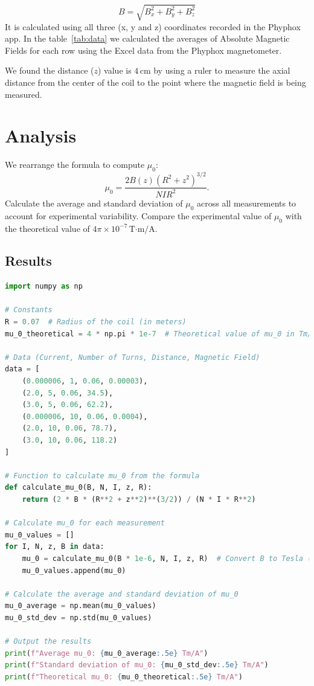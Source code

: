 \documentclass[notitlepage]{report}
\newcounter{theo}[section]\setcounter{theo}{0}
\numberwithin{equation}{section}
\theoremstyle{plain}
\theoremstyle{definition}
\theoremstyle{remark}
\begin{document}
\[
B = \sqrt{B_x^2 + B_y^2 + B_z^2}
\]
It is calculated using all three (x, y and z) coordinates recorded in the
Phyphox app. In the table~\ref{tab:data} we calculated the averages of
Absolute Magnetic Fields for each row using the Excel data from the Phyphox
magnetometer.

We found the distance (\(z\)) value is \(4 \, \text{cm}\) by using a ruler to
measure the axial distance from the center of the coil to the point where the
magnetic field is being measured.  

\section{Analysis}
We rearrange the formula to compute \(\mu_0\):
\[
    \mu_0 = \frac{2 B(z) {\left(R^2 + z^2\right)}^{3/2}}{N I R^2}.
\]
Calculate the average and standard deviation of \(\mu_0\) across all
measurements to account for experimental variability. Compare the experimental
value of \(\mu_0\) with the theoretical value of \(4\pi \times 10^{-7} \,
\text{T·m/A}\).


\subsection{Results}

\begin{lstlisting}[language=Python, caption={Python code for calculating \(\mu_0\)}, basicstyle=\ttfamily\footnotesize, keywordstyle=\color{blue}, commentstyle=\color{gray}]
import numpy as np

# Constants
R = 0.07  # Radius of the coil (in meters)
mu_0_theoretical = 4 * np.pi * 1e-7  # Theoretical value of mu_0 in Tm/A

# Data (Current, Number of Turns, Distance, Magnetic Field)
data = [
    (0.000006, 1, 0.06, 0.00003),
    (2.0, 5, 0.06, 34.5),
    (3.0, 5, 0.06, 62.2),
    (0.000006, 10, 0.06, 0.0004),
    (2.0, 10, 0.06, 78.7),
    (3.0, 10, 0.06, 118.2)
]

# Function to calculate mu_0 from the formula
def calculate_mu_0(B, N, I, z, R):
    return (2 * B * (R**2 + z**2)**(3/2)) / (N * I * R**2)

# Calculate mu_0 for each measurement
mu_0_values = []
for I, N, z, B in data:
    mu_0 = calculate_mu_0(B * 1e-6, N, I, z, R)  # Convert B to Tesla (since B is in microteslas)
    mu_0_values.append(mu_0)

# Calculate the average and standard deviation of mu_0
mu_0_average = np.mean(mu_0_values)
mu_0_std_dev = np.std(mu_0_values)

# Output the results
print(f"Average mu_0: {mu_0_average:.5e} Tm/A")
print(f"Standard deviation of mu_0: {mu_0_std_dev:.5e} Tm/A")
print(f"Theoretical mu_0: {mu_0_theoretical:.5e} Tm/A")
\end{lstlisting}
\end{document}
